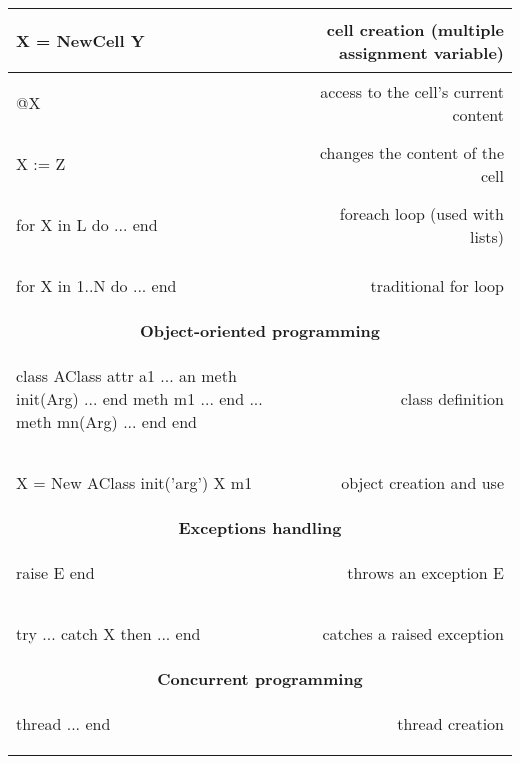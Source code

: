 \documentclass[12pt]{article}
\begin{document}
\begin{longtable}{l r}
\begin{oz}
X = {NewCell Y}
\end{oz}
&cell creation (multiple assignment variable) \\
\hline

\begin{oz}
@X
\end{oz}
& access to the cell's current content\\
\hline

\begin{oz}
X := Z
\end{oz}
&changes the content of the cell \\
\hline

\begin{oz}
for X in L do 
  ...
end
\end{oz}
&foreach loop (used with lists)\\
\hline

\begin{oz}
for X in 1..N do 
  ...
end
\end{oz}
&traditional for loop \\[0.4em]



\midrule[0.3mm]
\multicolumn{2}{c}{\textbf{Object-oriented programming}}\\
\midrule[0.3mm]



\begin{oz}
class AClass
	attr a1 ... an
	meth init(Arg) ... end
	meth m1 ... end
		...
	meth mn(Arg) ... end
end
\end{oz}
&class definition\\
\hline

\begin{oz}
X = {New AClass init('arg')}
{X m1}
\end{oz}
&object creation and use\\[0.4em]



\midrule[0.3mm]
\multicolumn{2}{c}{\textbf{Exceptions handling}}\\
\midrule[0.3mm]



\begin{oz}
raise E end
\end{oz}
&throws an exception E \\
\hline

\begin{oz}
try ... catch X then ... end
\end{oz}
&catches a raised exception\\[0.4em]



\midrule[0.3mm]
\multicolumn{2}{c}{\textbf{Concurrent programming}}\\
\midrule[0.3mm]



\begin{oz}
thread ... end
\end{oz}
&thread creation\\


\end{longtable}
\end{document}
